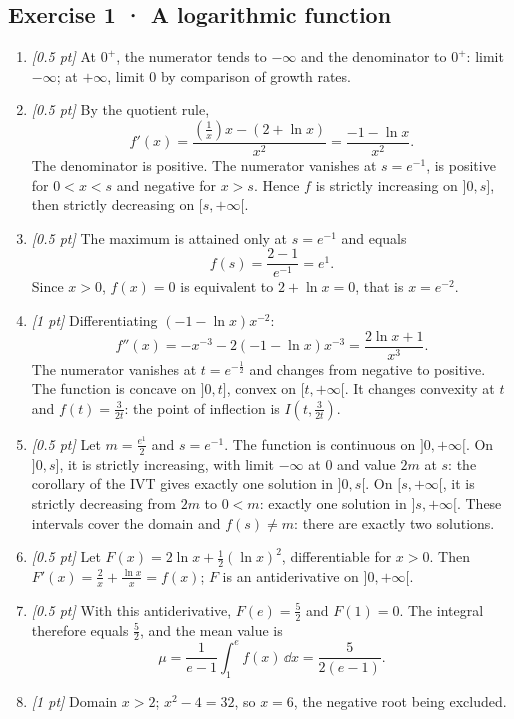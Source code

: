 \subsection*{Exercise 1 · A logarithmic function}\begin{enumerate}

\item \textit{[0.5 pt]} At $0^+$, the numerator tends to $-\infty$ and the denominator to $0^+$: limit $-\infty$; at $+\infty$, limit $0$ by comparison of growth rates.

\item \textit{[0.5 pt]} By the quotient rule,
\[f'(x)=\frac{(\frac{1}{x})x-(2+\ln x)}{x^2}=\frac{-1-\ln x}{x^2}.\]
The denominator is positive. The numerator vanishes at $s=e^{-1}$, is positive for $0<x<s$ and negative for $x>s$. Hence $f$ is strictly increasing on $]0,s]$, then strictly decreasing on $[s,+\infty[$.

\item \textit{[0.5 pt]} The maximum is attained only at $s=e^{-1}$ and equals
\[f(s)=\frac{2- 1}{e^{-1}}=e^{1}.\]
Since $x>0$, $f(x)=0$ is equivalent to $2+\ln x=0$, that is $x=e^{-2}$.

\item \textit{[1 pt]} Differentiating $(-1-\ln x)x^{-2}$:
\[f''(x)=-x^{-3}-2(-1-\ln x)x^{-3}=\frac{2\ln x+1}{x^3}.\]
The numerator vanishes at $t=e^{-\frac{1}{2}}$ and changes from negative to positive. The function is concave on $]0,t]$, convex on $[t,+\infty[$. It changes convexity at $t$ and $f(t)=\frac{3}{2t}$: the point of inflection is $I(t,\frac{3}{2t})$.

\item \textit{[0.5 pt]} Let $m=\frac{e^{1}}{2}$ and $s=e^{-1}$. The function is continuous on $]0,+\infty[$. On $]0,s]$, it is strictly increasing, with limit $-\infty$ at $0$ and value $2m$ at $s$: the corollary of the IVT gives exactly one solution in $]0,s[$. On $[s,+\infty[$, it is strictly decreasing from $2m$ to $0<m$: exactly one solution in $]s,+\infty[$. These intervals cover the domain and $f(s)\ne m$: there are exactly two solutions.

\item \textit{[0.5 pt]} Let $F(x)=2\ln x+\frac12(\ln x)^2$, differentiable for $x>0$. Then $F'(x)=\frac{2}{x}+\frac{\ln x}{x}=f(x)$; $F$ is an antiderivative on $]0,+\infty[$.

\item \textit{[0.5 pt]} With this antiderivative, $F(e)=\frac{5}{2}$ and $F(1)=0$. The integral therefore equals $\frac{5}{2}$, and the mean value is
\[\mu=\frac{1}{e-1}\int_1^e f(x)\,\dd x=\frac{5}{2(e-1)}.\]

\item \textit{[1 pt]} Domain $x>2$; $x^2-4=32$, so $x=6$, the negative root being excluded.

\end{enumerate}

